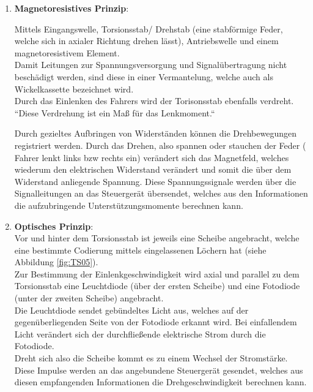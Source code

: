 	            \begin{enumerate}
	                \item \textbf{Magnetoresistives Prinzip}:
	                
	                         Mittels Eingangswelle, Torsionsstab/ Drehstab (eine stabförmige Feder, welche sich in axialer Richtung drehen lässt), Antriebswelle und einem magnetoresistivem Element. \\
	                         Damit Leitungen zur Spannungsversorgung und Signalübertragung nicht beschädigt werden, sind diese in einer Vermantelung, welche auch als Wickelkassette bezeichnet wird.\\
	                         
	                         Durch das Einlenken des Fahrers wird der Torisonsstab ebenfalls verdreht. ``Diese Verdrehung ist ein Maß für das Lenkmoment.`` \cite{TS_dreh}
	
	                         Durch gezieltes Aufbringen von Widerständen können die Drehbewegungen registriert werden. Durch das Drehen, also spannen oder stauchen der Feder ( Fahrer lenkt links bzw rechts ein) verändert sich das Magnetfeld, welches wiederum den elektrischen Widerstand verändert und somit die über dem Widerstand anliegende Spannung. Diese Spannungssignale werden über die Signalleitungen an das Steuergerät übersendet, welches aus den Informationen die aufzubringende Unterstützungsmomente berechnen kann.				 
	
	                \item \textbf{Optisches Prinzip}:\\
	
	                        Vor und hinter dem Torsionsstab ist jeweils eine Scheibe angebracht, welche eine bestimmte Codierung mittels eingelassenen Löchern hat (siehe Abbildung \ref{fig:TS05}).\\
	                        Zur Bestimmung der Einlenkgeschwindigkeit wird axial und parallel zu dem Torsionsstab eine Leuchtdiode (über der ersten Scheibe) und eine Fotodiode (unter der zweiten Scheibe) angebracht. \\
	                        Die Leuchtdiode sendet gebündeltes Licht aus, welches auf der gegenüberliegenden Seite von der Fotodiode erkannt wird. Bei einfallendem Licht verändert sich der durchfließende elektrische Strom durch die Fotodiode.\\
	                        Dreht sich also die Scheibe kommt es zu einem Wechsel der Stromstärke. Diese Impulse werden an das angebundene Steuergerät gesendet, welches aus diesen empfangenden Informationen die Drehgeschwindigkeit berechnen kann.\\
	                        

\end{enumerate}
